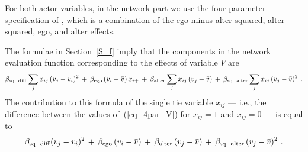 \documentclass[a4paper,fleqn,11pt]{article}
\newcommand{\+}{\, + \,}
\begin{document}
For both actor variables, in the network part we use the
four-parameter specification of \citet{SL2019}, which is
a combination of the ego minus alter squared, alter squared,
ego, and alter effects.

The formulae in Section~\ref{S_f} imply that the
components in the network evaluation function corresponding to the effects
of variable $V$ are
\begin{equation}
\beta_{\rm sq.\ diff}  \sum_j x_{ij}\, (v_j - v_i)^2  \, + \,
 \beta_{\rm ego}\, (v_i - \bar v) \, x_{i+}
           \, + \, \beta_{\rm alter}  \sum_j x_{ij}\, (v_j - \bar v)
 \, + \, \beta_{\rm sq.\ alter}  \sum_j x_{ij}\, (v_j - \bar v)^2  \ .
          \label{eq_4par_V}
\end{equation}
The contribution to this formula of the single tie variable $x_{ij}$  ---
i.e., the difference between the values of~(\ref{eq_4par_V}) for $x_{ij}=1$
and $x_{ij}=0$  ---  is equal to
\begin{equation}
\beta_{\rm sq.\ diff}   (v_j - v_i)^2 \, + \,
  \beta_{\rm ego}\, (v_i - \bar v)
         \, + \, \beta_{\rm alter}\,  (v_j - \bar v) \, + \,
      \beta_{\rm sq.\ alter}  \, (v_j - \bar v)^2   \ .
                 \label{eq_4par}
\end{equation}

\end{document}
